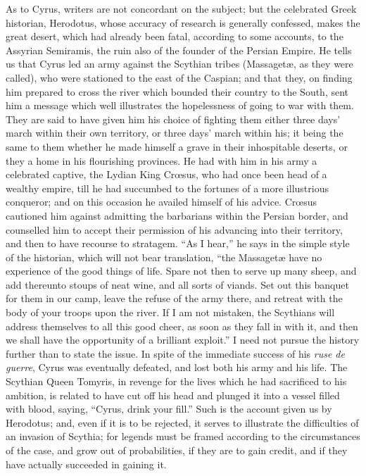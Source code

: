As to Cyrus, writers are not
concordant on the subject; but the celebrated Greek historian,
Herodotus, whose accuracy of research is generally confessed, makes
the great desert, which had already been fatal, according to some
accounts, to the Assyrian Semiramis, the ruin also of the founder of
the Persian Empire. He tells us that Cyrus led an army against the
Scythian tribes (Massagetæ, as they were called), who were stationed
to the east of the Caspian; and that they, on finding him prepared to
cross the river which bounded their country to the South, sent him a
message which well illustrates the hopelessness of going to war with
them. They are said to have given him his choice of fighting them
either three days' march within their own territory, or three days'
march within his; it being the same to them whether he made himself a
grave in their inhospitable deserts, or they a home in his flourishing
provinces. He had with him in his army a celebrated captive, the
Lydian King Crœsus, who had once been head of a wealthy empire,
till he had succumbed to the fortunes of a more illustrious conqueror;
and on this occasion he availed himself of his advice. Crœsus
cautioned him against admitting the barbarians within the Persian
border, and counselled him to accept their permission of his advancing
into their territory, and then to have recourse to stratagem. ``As I
hear,'' he says in the simple style of the historian, which will not
bear translation, ``the Massagetæ have no experience of the good
things of life. Spare not then to serve up many sheep, and add
thereunto stoups of neat wine, and all sorts of viands. Set out this
banquet for them in our camp, leave the refuse of the army there, and
retreat with the body of your troops upon the river. If I am not
mistaken, the Scythians will address themselves to all this good
cheer, as soon as they fall in with it, and then we shall have the
opportunity of a brilliant exploit.'' I need not pursue the history
further than to state the issue. In spite of the immediate success of
his \emph{ruse de guerre}, Cyrus was eventually defeated, and lost
both his army and his life. The Scythian Queen Tomyris, in revenge for
the lives which he had sacrificed to his ambition, is related to have
cut off his head and plunged it into a vessel filled with blood,
saying, ``Cyrus, drink your fill.'' Such is the account given us by
Herodotus; and, even if it is to be rejected, it serves to illustrate
the difficulties of an invasion of Scythia; for legends must be framed
according to the circumstances of the case, and grow out of
probabilities, if they are to gain credit, and if they have actually
succeeded in gaining it.

